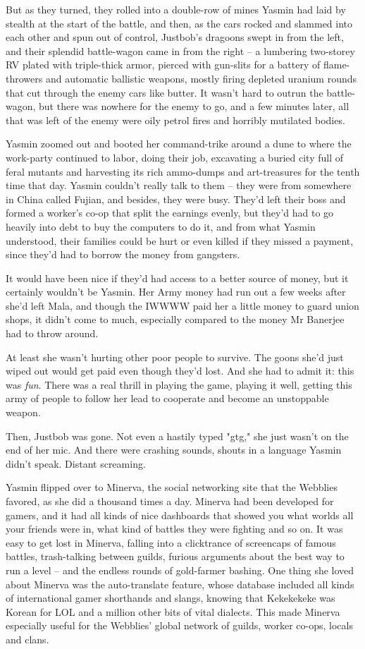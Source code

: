 But as they turned, they rolled into a double-row of mines Yasmin
had laid by stealth at the start of the battle, and then, as the
cars rocked and slammed into each other and spun out of control,
Justbob's dragoons swept in from the left, and their splendid
battle-wagon came in from the right -- a lumbering two-storey RV
plated with triple-thick armor, pierced with gun-slits for a
battery of flame-throwers and automatic ballistic weapons, mostly
firing depleted uranium rounds that cut through the enemy cars like
butter. It wasn't hard to outrun the battle-wagon, but there was
nowhere for the enemy to go, and a few minutes later, all that was
left of the enemy were oily petrol fires and horribly mutilated
bodies.

Yasmin zoomed out and booted her command-trike around a dune to
where the work-party continued to labor, doing their job,
excavating a buried city full of feral mutants and harvesting its
rich ammo-dumps and art-treasures for the tenth time that day.
Yasmin couldn't really talk to them -- they were from somewhere in
China called Fujian, and besides, they were busy. They'd left their
boss and formed a worker's co-op that split the earnings evenly,
but they'd had to go heavily into debt to buy the computers to do
it, and from what Yasmin understood, their families could be hurt
or even killed if they missed a payment, since they'd had to borrow
the money from gangsters.

It would have been nice if they'd had access to a better source of
money, but it certainly wouldn't be Yasmin. Her Army money had run
out a few weeks after she'd left Mala, and though the IWWWW paid
her a little money to guard union shops, it didn't come to much,
especially compared to the money Mr Banerjee had to throw around.

At least she wasn't hurting other poor people to survive. The goons
she'd just wiped out would get paid even though they'd lost. And
she had to admit it: this was \emph{fun}. There was a real thrill
in playing the game, playing it well, getting this army of people
to follow her lead to cooperate and become an unstoppable weapon.

Then, Justbob was gone. Not even a hastily typed "gtg," she just
wasn't on the end of her mic. And there were crashing sounds,
shouts in a language Yasmin didn't speak. Distant screaming.

Yasmin flipped over to Minerva, the social networking site that the
Webblies favored, as she did a thousand times a day. Minerva had
been developed for gamers, and it had all kinds of nice dashboards
that showed you what worlds all your friends were in, what kind of
battles they were fighting and so on. It was easy to get lost in
Minerva, falling into a clicktrance of screencaps of famous
battles, trash-talking between guilds, furious arguments about the
best way to run a level -- and the endless rounds of gold-farmer
bashing. One thing she loved about Minerva was the auto-translate
feature, whose database included all kinds of international gamer
shorthands and slangs, knowing that Kekekekeke was Korean for LOL
and a million other bits of vital dialects. This made Minerva
especially useful for the Webblies' global network of guilds,
worker co-ops, locals and clans.

